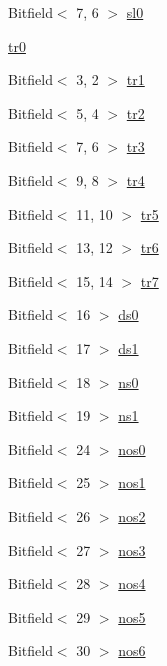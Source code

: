 \begin{DoxyCompactItemize}
Bitfield$<$ 7, 6 $>$ \hyperlink{namespaceArmISA_a2910621f78f683f2fdf0ab3509880afb}{sl0}
\item 
\hyperlink{namespaceArmISA_a2dbce5d45c74a935917865ca74027564}{tr0}
\item 
Bitfield$<$ 3, 2 $>$ \hyperlink{namespaceArmISA_ab806f86e32d5fc0273b658ad9d13376b}{tr1}
\item 
Bitfield$<$ 5, 4 $>$ \hyperlink{namespaceArmISA_a3f5ffb016dea062287f32987531241f4}{tr2}
\item 
Bitfield$<$ 7, 6 $>$ \hyperlink{namespaceArmISA_aa23d87740f682e6fbaae8cf8807fefcc}{tr3}
\item 
Bitfield$<$ 9, 8 $>$ \hyperlink{namespaceArmISA_acb11aa57f11c9ffe3e49cfbdf8230359}{tr4}
\item 
Bitfield$<$ 11, 10 $>$ \hyperlink{namespaceArmISA_a0dd5a09e16707cd9d7a25d65d55855e4}{tr5}
\item 
Bitfield$<$ 13, 12 $>$ \hyperlink{namespaceArmISA_a5863edf2d6b588f01b88858574125ead}{tr6}
\item 
Bitfield$<$ 15, 14 $>$ \hyperlink{namespaceArmISA_aa580e9562bf1153e4a9b6575701bd982}{tr7}
\item 
Bitfield$<$ 16 $>$ \hyperlink{namespaceArmISA_afe86c002e3d175546300a95cf3510f61}{ds0}
\item 
Bitfield$<$ 17 $>$ \hyperlink{namespaceArmISA_a502ff5ad76b96470a52c475c83b720de}{ds1}
\item 
Bitfield$<$ 18 $>$ \hyperlink{namespaceArmISA_add715fbe40f99daae45ac7ed3da3ae0e}{ns0}
\item 
Bitfield$<$ 19 $>$ \hyperlink{namespaceArmISA_a3c253ac96525a8ef80e9fc596f892b57}{ns1}
\item 
Bitfield$<$ 24 $>$ \hyperlink{namespaceArmISA_ab00410e0e70d77756192bcd4df942de1}{nos0}
\item 
Bitfield$<$ 25 $>$ \hyperlink{namespaceArmISA_a74733be552691237e5a50481418986fe}{nos1}
\item 
Bitfield$<$ 26 $>$ \hyperlink{namespaceArmISA_a51cb7698cfec694bd7d3aaf3752a72bf}{nos2}
\item 
Bitfield$<$ 27 $>$ \hyperlink{namespaceArmISA_ae4c23c8814c7f9f1beeab4a89006d97d}{nos3}
\item 
Bitfield$<$ 28 $>$ \hyperlink{namespaceArmISA_abf45047ec97fba21ca5466b943bc0a74}{nos4}
\item 
Bitfield$<$ 29 $>$ \hyperlink{namespaceArmISA_ace9fb760442433961f2297b72646eef9}{nos5}
\item 
Bitfield$<$ 30 $>$ \hyperlink{namespaceArmISA_a8a6b23cd1cd6e59d4abe43fa3cdfbb86}{nos6}

\end{DoxyCompactItemize}

